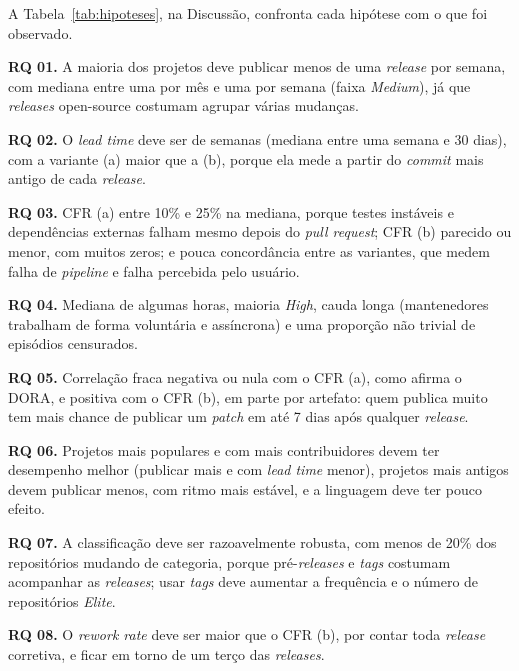 
A Tabela~\ref{tab:hipoteses}, na Discussão, confronta cada hipótese com o que foi observado.

\textbf{RQ 01.} A maioria dos projetos deve publicar menos de uma \textit{release} por semana,
com mediana entre uma por mês e uma por semana (faixa \textit{Medium}), já que
\textit{releases} open-source costumam agrupar várias mudanças.

\textbf{RQ 02.} O \textit{lead time} deve ser de semanas (mediana entre uma semana e 30 dias),
com a variante (a) maior que a (b), porque ela mede a partir do \textit{commit} mais antigo
de cada \textit{release}.

\textbf{RQ 03.} CFR (a) entre 10\% e 25\% na mediana, porque testes instáveis e dependências
externas falham mesmo depois do \textit{pull request}; CFR (b) parecido ou menor, com muitos
zeros; e pouca concordância entre as variantes, que medem falha de \textit{pipeline} e falha
percebida pelo usuário.

\textbf{RQ 04.} Mediana de algumas horas, maioria \textit{High}, cauda longa (mantenedores
trabalham de forma voluntária e assíncrona) e uma proporção não trivial de episódios
censurados.

\textbf{RQ 05.} Correlação fraca negativa ou nula com o CFR (a), como afirma o DORA, e
positiva com o CFR (b), em parte por artefato: quem publica muito tem mais chance de publicar
um \textit{patch} em até 7 dias após qualquer \textit{release}.

\textbf{RQ 06.} Projetos mais populares e com mais contribuidores devem ter desempenho melhor
(publicar mais e com \textit{lead time} menor), projetos mais antigos devem publicar menos,
com ritmo mais estável, e a linguagem deve ter pouco efeito.

\textbf{RQ 07.} A classificação deve ser razoavelmente robusta, com menos de 20\% dos
repositórios mudando de categoria, porque pré-\textit{releases} e \textit{tags} costumam
acompanhar as \textit{releases}; usar \textit{tags} deve aumentar a frequência e o número de
repositórios \textit{Elite}.

\textbf{RQ 08.} O \textit{rework rate} deve ser maior que o CFR (b), por contar toda
\textit{release} corretiva, e ficar em torno de um terço das \textit{releases}.
